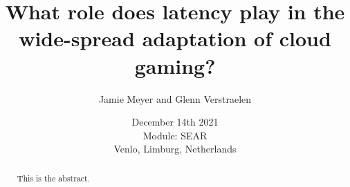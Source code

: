 \documentclass[]{report}
\title{What role does latency play in the wide-spread adaptation of cloud gaming?}
\author{Jamie Meyer and Glenn Verstraelen}
\date{December 14th 2021 \\Module: SEAR \\Venlo, Limburg, Netherlands}
\begin{document}
\maketitle

\begin{abstract}
This is the abstract.
\end{abstract}

\tableofcontents
\setcounter{page}{3}
{%
	\let\oldnumberline\numberline%
	\renewcommand{\numberline}{\figurename~\oldnumberline}%
	\listoffigures%
}
\pagebreak
{}	
	
 
 
 
 

\printbibliography[title=References]

\appendix

\end{document}
